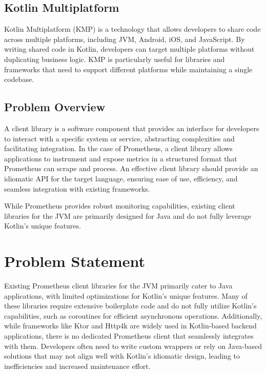 \documentclass[a4paper,twoside,11pt]{article}
\begin{document}
\subsection{Kotlin Multiplatform}
Kotlin Multiplatform\cite{kotlinmultiplatform:jetbrains} (KMP) is a technology that allows developers to share code across multiple platforms, including JVM, Android, iOS, and JavaScript. By writing shared code in Kotlin, developers can target multiple platforms without duplicating business logic. KMP is particularly useful for libraries and frameworks that need to support different platforms while maintaining a single codebase.


\subsection{Problem Overview}
A client library is a software component that provides an interface for developers to interact with a specific system or service, abstracting complexities and facilitating integration. In the case of Prometheus, a client library allows applications to instrument and expose metrics in a structured format that Prometheus can scrape and process. An effective client library should provide an idiomatic API for the target language, ensuring ease of use, efficiency, and seamless integration with existing frameworks.

While Prometheus provides robust monitoring capabilities, existing client libraries for the JVM are primarily designed for Java and do not fully leverage Kotlin’s unique features.

\section{Problem Statement}
Existing Prometheus client libraries for the JVM primarily cater to Java applications, with limited optimizations for Kotlin’s unique features. Many of these libraries require extensive boilerplate code and do not fully utilize Kotlin’s capabilities, such as coroutines for efficient asynchronous operations.
Additionally, while frameworks like Ktor and Http4k are widely used in Kotlin-based backend applications, there is no dedicated Prometheus client that seamlessly integrates with them. Developers often need to write custom wrappers or rely on Java-based solutions that may not align well with Kotlin’s idiomatic design, leading to inefficiencies and increased maintenance effort.
\end{document}
